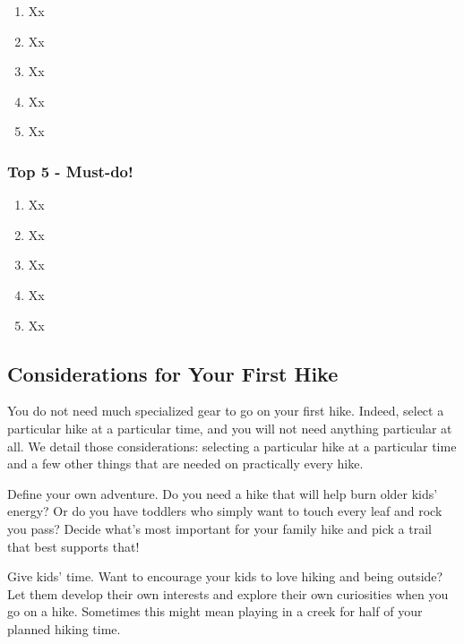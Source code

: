 \documentclass[
  letterpaper,
  DIV=11,
  numbers=noendperiod]{scrartcl}
\providecommand{\tightlist}{%
  \setlength{\itemsep}{0pt}\setlength{\parskip}{0pt}}\usepackage{longtable,booktabs,array}
\begin{document}
\begin{enumerate}
\def\labelenumi{\arabic{enumi}.}
\tightlist
\item
  Xx
\item
  Xx
\item
  Xx
\item
  Xx
\item
  Xx
\end{enumerate}

\hypertarget{top-5---must-do}{%
\subsubsection{Top 5 - Must-do!}\label{top-5---must-do}}

\begin{enumerate}
\def\labelenumi{\arabic{enumi}.}
\tightlist
\item
  Xx
\item
  Xx
\item
  Xx
\item
  Xx
\item
  Xx
\end{enumerate}

\hypertarget{considerations-for-your-first-hike}{%
\subsection{Considerations for Your First
Hike}\label{considerations-for-your-first-hike}}

You do not need much specialized gear to go on your first hike. Indeed,
select a particular hike at a particular time, and you will not need
anything particular at all. We detail those considerations: selecting a
particular hike at a particular time and a few other things that are
needed on practically every hike.

Define your own adventure. Do you need a hike that will help burn older
kids' energy? Or do you have toddlers who simply want to touch every
leaf and rock you pass? Decide what's most important for your family
hike and pick a trail that best supports that!

Give kids' time. Want to encourage your kids to love hiking and being
outside? Let them develop their own interests and explore their own
curiosities when you go on a hike. Sometimes this might mean playing in
a creek for half of your planned hiking time.
\end{document}
